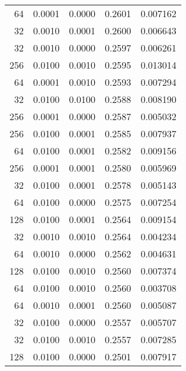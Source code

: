 \begin{tabular}{rrrrr}
  64 &  0.0001 &  0.0000 &  0.2601 &  0.007162 \\
  32 &  0.0010 &  0.0001 &  0.2600 &  0.006643 \\
  32 &  0.0010 &  0.0000 &  0.2597 &  0.006261 \\
 256 &  0.0100 &  0.0010 &  0.2595 &  0.013014 \\
  64 &  0.0001 &  0.0010 &  0.2593 &  0.007294 \\
  32 &  0.0100 &  0.0100 &  0.2588 &  0.008190 \\
 256 &  0.0001 &  0.0000 &  0.2587 &  0.005032 \\
 256 &  0.0100 &  0.0001 &  0.2585 &  0.007937 \\
  64 &  0.0100 &  0.0001 &  0.2582 &  0.009156 \\
 256 &  0.0001 &  0.0001 &  0.2580 &  0.005969 \\
  32 &  0.0100 &  0.0001 &  0.2578 &  0.005143 \\
  64 &  0.0100 &  0.0000 &  0.2575 &  0.007254 \\
 128 &  0.0100 &  0.0001 &  0.2564 &  0.009154 \\
  32 &  0.0010 &  0.0010 &  0.2564 &  0.004234 \\
  64 &  0.0010 &  0.0000 &  0.2562 &  0.004631 \\
 128 &  0.0100 &  0.0010 &  0.2560 &  0.007374 \\
  64 &  0.0100 &  0.0010 &  0.2560 &  0.003708 \\
  64 &  0.0010 &  0.0001 &  0.2560 &  0.005087 \\
  32 &  0.0100 &  0.0000 &  0.2557 &  0.005707 \\
  32 &  0.0100 &  0.0010 &  0.2557 &  0.007285 \\
 128 &  0.0100 &  0.0000 &  0.2501 &  0.007917 \\
\bottomrule
\end{tabular}
